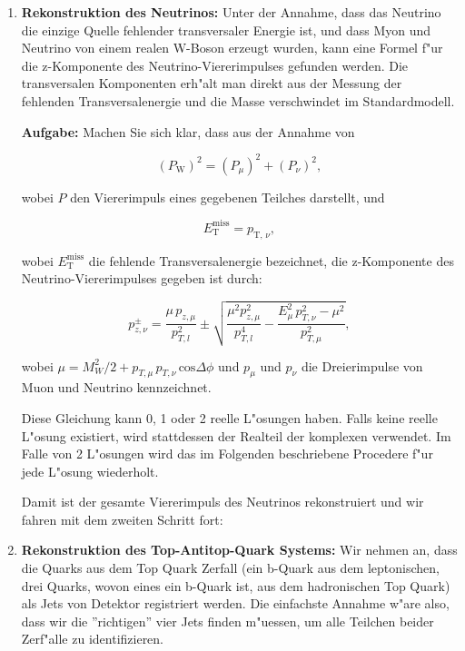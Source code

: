 \begin{enumerate}
\item \textbf{Rekonstruktion des Neutrinos:} Unter der Annahme, dass das Neutrino die einzige Quelle fehlender transversaler Energie ist, und dass Myon und Neutrino von einem realen W-Boson erzeugt wurden, kann eine Formel f"ur die z-Komponente des Neutrino-Viererimpulses gefunden werden. Die transversalen Komponenten erh"alt man direkt aus der Messung der fehlenden Transversalenergie und die Masse verschwindet im Standardmodell. 

\textbf{Aufgabe:} Machen Sie sich klar, dass aus der Annahme von 

\begin{equation}
\left(P_{\text{W}}\right)^2 = \left(P_{\mu}\right)^2 + \left(P_{\nu}\right)^2,
\end{equation}

\noindent wobei $P$ den Viererimpuls eines gegebenen Teilches darstellt, und 

\begin{equation}
E_{\text{T}}^{\text{miss}} = p_{\text{T, }\nu},
\end{equation}

\noindent wobei $E_{\text{T}}^{\text{miss}}$ die fehlende Transversalenergie bezeichnet, die z-Komponente des Neutrino-Viererimpulses gegeben ist durch: 

\begin{equation}
p_{z,\nu}^\pm = \frac{\mu\,p_{z,\mu}}{p_{T,l}^2} \pm \sqrt{\frac{\mu^2p_{z,\mu}^2}{p_{T,l}^4}-\frac{E_\mu^2\,p_{T,\nu}^2-\mu^2}{p_{T,\mu}^2}},
\end{equation}

\noindent wobei $\mu = M_W^2 / 2 + p_{T,\mu}\,p_{T,\nu}\,\text{cos}\Delta\phi$ und $p_{\mu}$ und $p_{\nu}$ die Dreierimpulse von Muon und Neutrino kennzeichnet.

Diese Gleichung kann 0, 1 oder 2 reelle L"osungen haben. Falls keine reelle L"osung existiert, wird stattdessen der Realteil der komplexen verwendet. Im Falle von 2 L"osungen wird das im Folgenden beschriebene Procedere f"ur jede L"osung wiederholt.

Damit ist der gesamte Viererimpuls des Neutrinos rekonstruiert und wir fahren mit dem zweiten Schritt fort:

\item \textbf{Rekonstruktion des Top-Antitop-Quark Systems:} Wir nehmen an, dass die Quarks aus dem Top Quark Zerfall (ein b-Quark aus dem leptonischen, drei Quarks, wovon eines ein b-Quark ist, aus dem hadronischen Top Quark) als Jets von Detektor registriert werden. Die einfachste Annahme w"are also, dass wir die ''richtigen'' vier Jets finden m"uessen, um alle Teilchen beider Zerf"alle zu identifizieren. 


\end{enumerate}
